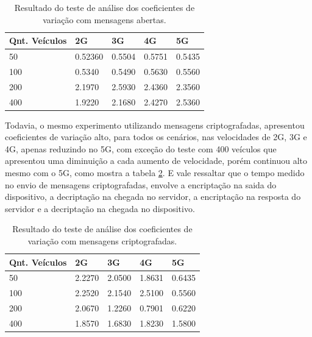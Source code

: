 \documentclass[
	12pt,				%
	oneside,			%
	a4paper,			%
	english,			%
	brazil				%
	]{abntex2ppgsi}
\begin{document}
\begin{table}[!h]
	\centering
	\caption{Resultado do teste de análise dos coeficientes de variação com mensagens abertas.}
	\label{tbEstatisticaVariacoes}
	\begin{tabular}{|p{4.0cm}|p{2.0cm}|p{2.0cm}|p{2.0cm}|p{2.0cm}|}
		\hline
		\rowcolor[gray]{0.7}
		Qnt. Veículos & 2G      & 3G     & 4G     & 5G      \\ \hline
		\cellcolor[gray]{0.7}50              & 0.52360 & 0.5504 & 0.5751 & 0.5435 \\ \hline
		\cellcolor[gray]{0.7}100             & 0.5340  & 0.5490 & 0.5630 & 0.5560  \\ \hline
		\cellcolor[gray]{0.7}200             & 2.1970  & 2.5930 & 2.4360 & 2.3560  \\ \hline
		\cellcolor[gray]{0.7}400             & 1.9220  & 2.1680 & 2.4270 & 2.5360  \\ \hline
	\end{tabular}
\end{table}

Todavia, o mesmo experimento utilizando mensagens criptografadas, apresentou coeficientes de variação alto, para todos os cenários, nas velocidades de 2G, 3G e 4G, apenas reduzindo no 5G, com exceção do teste com 400 veículos que apresentou uma diminuição a cada aumento de velocidade, porém continuou alto mesmo com o 5G, como mostra a tabela \ref{tbEstatisticaVariacoesencript}. E vale ressaltar que o tempo medido no envio de mensagens criptografadas, envolve a encriptação na saida do dispositivo, a decriptação na chegada no servidor, a encriptação na resposta do servidor e a decriptação na chegada no dispositivo.

\begin{table}[!h]
	\centering
	\caption{Resultado do teste de análise dos coeficientes de variação com mensagens criptografadas.}
	\label{tbEstatisticaVariacoesencript}
	\begin{tabular}{|p{4.0cm}|p{2.0cm}|p{2.0cm}|p{2.0cm}|p{2.0cm}|}
		\hline
		\rowcolor[gray]{0.7}
		Qnt. Veículos & 2G      & 3G     & 4G     & 5G      \\ \hline
		\cellcolor[gray]{0.7}50              & 2.2270 & 2.0500 & 1.8631 & 0.6435 \\ \hline
		\cellcolor[gray]{0.7}100             & 2.2520  & 2.1540 & 2.5100 & 0.5560  \\ \hline
		\cellcolor[gray]{0.7}200             & 2.0670  & 1.2260 & 0.7901 & 0.6220  \\ \hline
		\cellcolor[gray]{0.7}400             & 1.8570  & 1.6830 & 1.8230 & 1.5800  \\ \hline
	\end{tabular}
\end{table}
\end{document}
